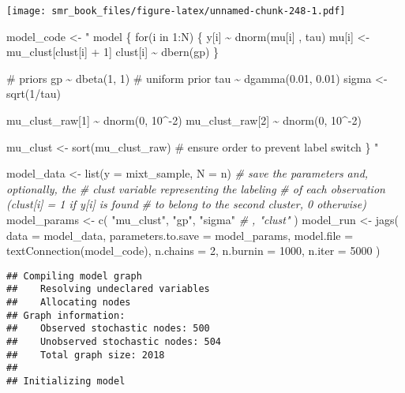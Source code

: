 \documentclass[
  oneside]{book}
\newenvironment{Shaded}{\begin{snugshade}}{\end{snugshade}}
\newcommand{\AttributeTok}[1]{\textcolor[rgb]{0.77,0.63,0.00}{#1}}
\newcommand{\CommentTok}[1]{\textcolor[rgb]{0.56,0.35,0.01}{\textit{#1}}}
\newcommand{\DecValTok}[1]{\textcolor[rgb]{0.00,0.00,0.81}{#1}}
\newcommand{\FunctionTok}[1]{\textcolor[rgb]{0.00,0.00,0.00}{#1}}
\newcommand{\NormalTok}[1]{#1}
\newcommand{\OtherTok}[1]{\textcolor[rgb]{0.56,0.35,0.01}{#1}}
\newcommand{\StringTok}[1]{\textcolor[rgb]{0.31,0.60,0.02}{#1}}
\begin{document}
\texttt{[image: smr\_book\_files/figure-latex/unnamed-chunk-248-1.pdf]}

\begin{Shaded}
\begin{Highlighting}[]
\NormalTok{model\_code }\OtherTok{\textless{}{-}} \StringTok{"}
\StringTok{model \{}
\StringTok{  for(i in 1:N) \{}
\StringTok{    y[i] \textasciitilde{} dnorm(mu[i] , tau)}
\StringTok{    mu[i] \textless{}{-} mu\_clust[clust[i] + 1]}
\StringTok{    clust[i] \textasciitilde{} dbern(gp)}
\StringTok{  \}}

\StringTok{  \# priors}
\StringTok{  gp \textasciitilde{} dbeta(1, 1) \# uniform prior}
\StringTok{  tau \textasciitilde{} dgamma(0.01, 0.01)}
\StringTok{  sigma \textless{}{-} sqrt(1/tau)}

\StringTok{  mu\_clust\_raw[1] \textasciitilde{} dnorm(0, 10\^{}{-}2)}
\StringTok{  mu\_clust\_raw[2] \textasciitilde{} dnorm(0, 10\^{}{-}2)}

\StringTok{  mu\_clust \textless{}{-} sort(mu\_clust\_raw) \# ensure order to prevent label switch}
\StringTok{\}}
\StringTok{"}

\NormalTok{model\_data }\OtherTok{\textless{}{-}} \FunctionTok{list}\NormalTok{(}\AttributeTok{y =}\NormalTok{ mixt\_sample, }\AttributeTok{N =}\NormalTok{ n)}
\CommentTok{\# save the parameters and, optionally, the}
\CommentTok{\# \textasciigrave{}clust\textasciigrave{} variable representing the labeling}
\CommentTok{\# of each observation (clust[i] = 1 if y[i] is found}
\CommentTok{\# to belong to the second cluster, 0 otherwise)}
\NormalTok{model\_params }\OtherTok{\textless{}{-}} \FunctionTok{c}\NormalTok{(}
  \StringTok{"mu\_clust"}\NormalTok{, }\StringTok{"gp"}\NormalTok{, }\StringTok{"sigma"}
  \CommentTok{\# , "clust"}
\NormalTok{)}
\NormalTok{model\_run }\OtherTok{\textless{}{-}} \FunctionTok{jags}\NormalTok{(}
  \AttributeTok{data =}\NormalTok{ model\_data,}
  \AttributeTok{parameters.to.save =}\NormalTok{ model\_params,}
  \AttributeTok{model.file =} \FunctionTok{textConnection}\NormalTok{(model\_code),}
  \AttributeTok{n.chains =} \DecValTok{2}\NormalTok{, }\AttributeTok{n.burnin =} \DecValTok{1000}\NormalTok{, }\AttributeTok{n.iter =} \DecValTok{5000}
\NormalTok{)}
\end{Highlighting}
\end{Shaded}

\begin{verbatim}
## Compiling model graph
##    Resolving undeclared variables
##    Allocating nodes
## Graph information:
##    Observed stochastic nodes: 500
##    Unobserved stochastic nodes: 504
##    Total graph size: 2018
## 
## Initializing model
\end{verbatim}
\end{document}
